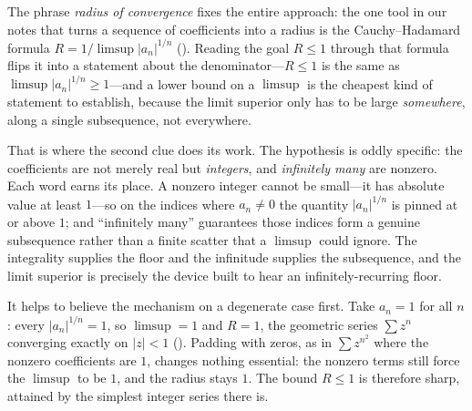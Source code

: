 \documentclass[main.tex]{subfiles}
\begin{document}
\begin{Reflection}
The phrase \emph{radius of convergence} fixes the entire approach: the one tool in our notes that turns
a sequence of coefficients into a radius is the Cauchy--Hadamard formula $R=1/\limsup|a_n|^{1/n}$
(). Reading the goal $R\le 1$ through that formula flips it into a statement about the
denominator---$R\le 1$ is the same as $\limsup|a_n|^{1/n}\ge 1$---and a lower bound on a $\limsup$ is
the cheapest kind of statement to establish, because the limit superior only has to be large
\emph{somewhere}, along a single subsequence, not everywhere.

That is where the second clue does its work. The hypothesis is oddly specific: the coefficients are
not merely real but \emph{integers}, and \emph{infinitely many} are nonzero. Each word earns its place.
A nonzero integer cannot be small---it has absolute value at least $1$---so on the indices where
$a_n\neq 0$ the quantity $|a_n|^{1/n}$ is pinned at or above $1$; and ``infinitely many'' guarantees
those indices form a genuine subsequence rather than a finite scatter that a $\limsup$ could ignore.
The integrality supplies the floor and the infinitude supplies the subsequence, and the limit superior
is precisely the device built to hear an infinitely-recurring floor.

It helps to believe the mechanism on a degenerate case first. Take $a_n=1$ for all $n$: every
$|a_n|^{1/n}=1$, so $\limsup=1$ and $R=1$, the geometric series $\sum z^n$ converging exactly on
$|z|<1$ (). Padding with zeros, as in $\sum z^{n^2}$ where the nonzero coefficients are
$1$, changes nothing essential: the nonzero terms still force the $\limsup$ to be $1$, and the radius
stays $1$. The bound $R\le 1$ is therefore sharp, attained by the simplest integer series there is.


\end{Reflection}
\end{document}
